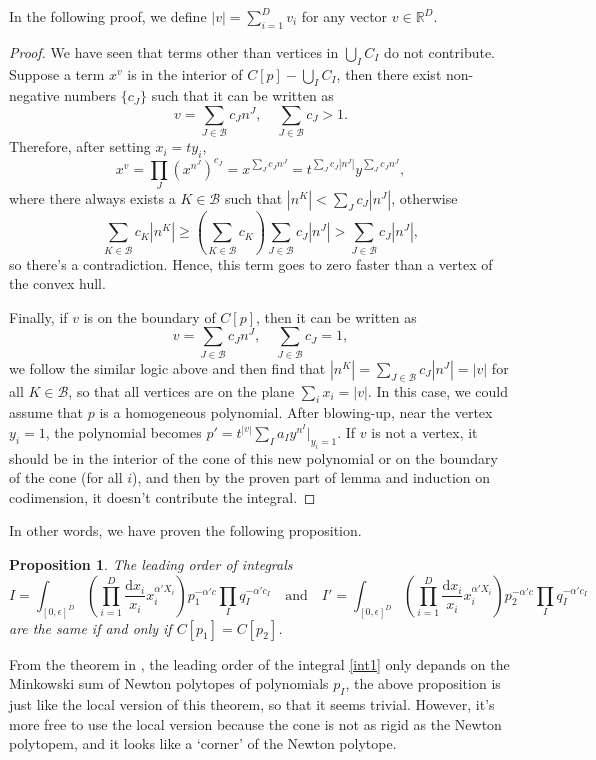 \documentclass[12pt]{article}
\theoremstyle{definition}
\theoremstyle{plain}
\newtheorem{pro}[para]{Proposition}
\newcommand{\dif}{\mathrm{d}} %
\begin{document}
In the following proof, we define $|v|=\sum_{i=1}^D v_i$ for any vector $v\in \mathbb R^D$.

\begin{proof}
We have seen that terms other than vertices in $\bigcup_I C_I$ do not contribute. Suppose a term $x^v$ 
is in the interior of $C[p]-\bigcup_I C_I$,  
then there exist non-negative numbers $\{c_J\}$ such that it can be written as 
\[
	v = \sum_{J\in \mathscr B}c_J n^J,\quad \sum_{J\in \mathscr B} c_J>1.
\]
Therefore, after setting $x_i=t y_i$,  
\[
	x^{v}=\prod_J (x^{n^J})^{c_J}=x^{\sum_J c_J n^J} = t^{\sum_J c_J |n^J|}y^{\sum_J c_J n^J},
\]
where there always exists a $K\in \mathscr B$ such that $|n^K|<\sum_J c_J |n^J|$, otherwise
\[
	\sum_{K\in \mathscr B} c_K|n^K|\geq \left(\sum_{K\in \mathscr B} c_K\right)
	\sum_{J\in \mathscr B} c_J |n^J|>\sum_{J\in \mathscr B} c_J |n^J|,
\]
so there's a contradiction. Hence, this term goes to zero faster than a vertex of the convex hull.

Finally, if $v$ is on the boundary of $C[p]$, then it can be written as 
\[
	v = \sum_{J\in \mathscr B}c_J n^J,\quad \sum_{J\in \mathscr B} c_J=1,
\]
we follow the similar logic above and then find that $|n^K|=\sum_{J\in\mathscr B} c_J |n^J|=|v|$ for
all $K\in\mathscr B$, so that all vertices are on the plane $\sum_i x_i=|v|$. 
In this case, we could assume that $p$ is a homogeneous polynomial. After blowing-up, near the vertex
$y_i=1$, the polynomial becomes $p'=t^{|v|}\sum_{I}a_I y^{n^I}|_{y_i=1}$. 
If $v$ is not a vertex, it should be in the interior of the cone of this new polynomial or 
on the boundary of the cone (for all $i$), and then by 
the proven part of lemma and induction on codimension, it doesn't contribute the integral.
\end{proof}

In other words, we have proven the following proposition. 

\begin{pro}
The leading order of integrals
\[
	I=\int_{[0,\epsilon]^D} \left(\prod_{i=1}^D\frac{\dif x_i}{x_i}x_i^{\alpha' X_i}\right)
	p_1^{-\alpha' c} \prod_I q_I^{-\alpha' c_I}
	\quad \text{and} \quad 
	I'=\int_{[0,\epsilon]^D} \left(\prod_{i=1}^D\frac{\dif x_i}{x_i}x_i^{\alpha' X_i}\right)
	p_2^{-\alpha' c} \prod_I q_I^{-\alpha' c_I}
\]
are the same if and only if $C[p_1]=C[p_2]$.
\end{pro}

From the theorem in \cite{}, the leading order of the integral \ref{int1} 
only depands on the Minkowski sum of Newton polytopes of polynomials $p_I$, 
the above proposition is just like the local version of this theorem, so that 
it seems trivial. However, it's more free to use the local version because 
the cone is not as rigid as the Newton polytopem, and it looks  
like a `corner' of the Newton polytope.
\end{document}
